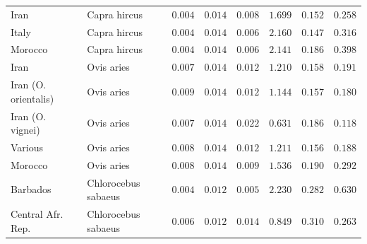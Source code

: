 \documentclass[12pt]{article}
\begin{document}
\begin{center}
\begin{longtable*}{|l|l|r|r|r|r|r|r|}
             Iran &        Capra hircus &               $ 0.004$ &              $ 0.014$ &              $ 0.008$ &                                          $ 1.699$ &                         $ 0.152$ &                      $ 0.258$ \\
             Italy &        Capra hircus &               $ 0.004$ &              $ 0.014$ &              $ 0.006$ &                                          $ 2.160$ &                         $ 0.147$ &                      $ 0.316$ \\
             Morocco &        Capra hircus &               $ 0.004$ &              $ 0.014$ &              $ 0.006$ &                                          $ 2.141$ &                         $ 0.186$ &                      $ 0.398$ \\
            Iran &          Ovis aries &               $ 0.007$ &              $ 0.014$ &              $ 0.012$ &                                          $ 1.210$ &                         $ 0.158$ &                      $ 0.191$ \\
            Iran (O. orientalis) &          Ovis aries &               $ 0.009$ &              $ 0.014$ &              $ 0.012$ &                                          $ 1.144$ &                         $ 0.157$ &                      $ 0.180$ \\
            Iran (O. vignei) &          Ovis aries &               $ 0.007$ &              $ 0.014$ &              $ 0.022$ &                                          $ 0.631$ &                         $ 0.186$ &                      $ 0.118$ \\
            Various &          Ovis aries &               $ 0.008$ &              $ 0.014$ &              $ 0.012$ &                                          $ 1.211$ &                         $ 0.156$ &                      $ 0.188$ \\
            Morocco &          Ovis aries &               $ 0.008$ &              $ 0.014$ &              $ 0.009$ &                                          $ 1.536$ &                         $ 0.190$ &                      $ 0.292$ \\
             Barbados & Chlorocebus sabaeus &               $ 0.004$ &              $ 0.012$ &              $ 0.005$ &                                          $ 2.230$ &                         $ 0.282$ &                      $ 0.630$ \\
             Central Afr. Rep. & Chlorocebus sabaeus &               $ 0.006$ &              $ 0.012$ &              $ 0.014$ &                                          $ 0.849$ &                         $ 0.310$ &                      $ 0.263$ \\

\end{longtable*}
\end{center}
\end{document}
